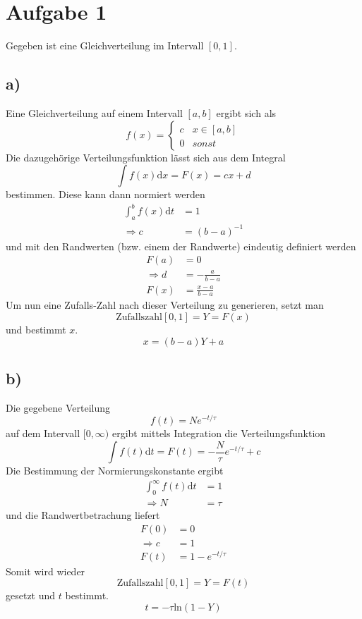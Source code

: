 \section{Aufgabe 1}
\label{sec:Aufgabe1}
Gegeben ist eine Gleichverteilung im Intervall $[0,1]$.
\subsection{a)}
Eine Gleichverteilung auf einem Intervall $[a,b]$ ergibt sich als
\begin{equation}
  f(x)=
  \begin{cases}
    c&x\in[a,b]\\
    0&sonst
  \end{cases}
\end{equation}
Die dazugehörige Verteilungsfunktion lässt sich aus dem Integral
\begin{equation}
  \int f(x)\text{d}x=F(x)=cx+d
\end{equation}
bestimmen.
Diese kann dann normiert werden
\begin{align}
  \int_a^{b}f(x)\text{d}t&=1\\
  \Rightarrow c&=(b-a)^{-1}
\end{align}
und mit den Randwerten (bzw. einem der Randwerte) eindeutig definiert werden
\begin{align}
  F(a)&=0\\
  \Rightarrow d&=-\frac{a}{b-a}\\
  F(x)&=\frac{x-a}{b-a}
\end{align}
Um nun eine Zufalls-Zahl nach dieser Verteilung zu generieren, setzt man
\begin{equation}
  \text{Zufallszahl}[0,1]=Y=F(x)
\end{equation}
und bestimmt $x$.
\begin{equation}
  x=(b-a)Y+a
\end{equation}
\subsection{b)}
Die gegebene Verteilung
\begin{equation}
  f(t)=Ne^{-t/\tau}
\end{equation}
auf dem Intervall $[0,\infty)$ ergibt mittels Integration die Verteilungsfunktion
\begin{equation}
  \int f(t)\text{d}t=F(t)=-\frac{N}{\tau}e^{-t/\tau}+c
\end{equation}
Die Bestimmung der Normierungskonstante ergibt
\begin{align}
  \int_0^{\infty}f(t)\text{d}t&=1\\
  \Rightarrow N&=\tau
\end{align}
und die Randwertbetrachung liefert
\begin{align}
  F(0)&=0\\
  \Rightarrow c&=1\\
  F(t)&=1-e^{-t/\tau}
\end{align}
Somit wird wieder
\begin{equation}
  \text{Zufallszahl}[0,1]=Y=F(t)
\end{equation}
gesetzt und $t$ bestimmt.
\begin{equation}
  t=-\tau \text{ln}(1-Y)
\end{equation}
